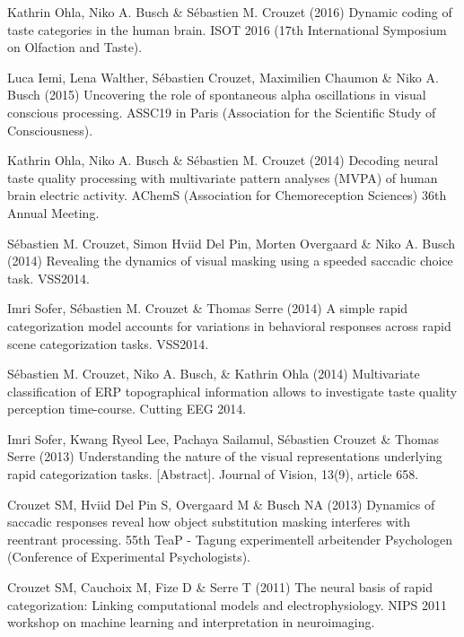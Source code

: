 \documentclass[margin,line]{resume}
\begin{document}
\begin{resume}
Kathrin Ohla, Niko A. Busch \& Sébastien M. Crouzet (2016) Dynamic coding of taste categories in the human brain. ISOT 2016 (17th International Symposium on Olfaction and Taste).

\vspace{-2mm} Luca Iemi, Lena Walther, Sébastien Crouzet, Maximilien Chaumon \& Niko A. Busch (2015) Uncovering the role of spontaneous alpha oscillations in visual conscious processing. ASSC19 in Paris (Association for the Scientific Study of Consciousness).
	
\vspace{-2mm} Kathrin Ohla, Niko A. Busch \& Sébastien M. Crouzet (2014) Decoding neural taste quality processing with multivariate pattern analyses (MVPA) of human brain electric activity. AChemS (Association for Chemoreception Sciences) 36th Annual Meeting.

\vspace{-2mm} Sébastien M. Crouzet, Simon Hviid Del Pin, Morten Overgaard \& Niko A. Busch (2014) Revealing the dynamics of visual masking using a speeded saccadic choice task. VSS2014.

\vspace{-2mm} Imri Sofer, Sébastien M. Crouzet \& Thomas Serre (2014) A simple rapid categorization model accounts for variations in behavioral responses across rapid scene categorization tasks. VSS2014.

\vspace{-2mm} Sébastien M. Crouzet, Niko A. Busch, \& Kathrin Ohla (2014) Multivariate classification of ERP topographical information allows to investigate taste quality perception time-course. Cutting EEG 2014.

\vspace{-2mm} Imri Sofer, Kwang Ryeol Lee, Pachaya Sailamul, Sébastien Crouzet \& Thomas Serre (2013) Understanding the nature of the visual representations underlying rapid categorization tasks.  [Abstract]. Journal of Vision, 13(9), article 658.

\vspace{-2mm} Crouzet SM, Hviid Del Pin S, Overgaard M \& Busch NA (2013) Dynamics of saccadic responses reveal how object substitution masking interferes with reentrant processing. 55th TeaP - Tagung experimentell arbeitender Psychologen (Conference of Experimental Psychologists).

\vspace{-2mm} Crouzet SM, Cauchoix M, Fize D \& Serre T (2011) The neural basis of rapid categorization: Linking computational models and electrophysiology. NIPS 2011 workshop on machine learning and interpretation in neuroimaging.


\end{resume}
\end{document}
